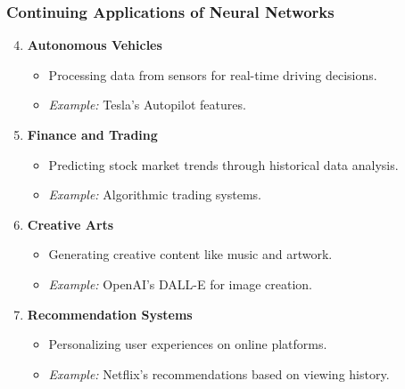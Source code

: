\documentclass[aspectratio=169]{beamer}
\begin{document}
\begin{frame}[fragile]
    \frametitle{Continuing Applications of Neural Networks}

    \begin{enumerate}
        \setcounter{enumi}{3} %
        \item \textbf{Autonomous Vehicles}
        \begin{itemize}
            \item Processing data from sensors for real-time driving decisions.
            \item \textit{Example:} Tesla's Autopilot features.
        \end{itemize}

        \item \textbf{Finance and Trading}
        \begin{itemize}
            \item Predicting stock market trends through historical data analysis.
            \item \textit{Example:} Algorithmic trading systems.
        \end{itemize}

        \item \textbf{Creative Arts}
        \begin{itemize}
            \item Generating creative content like music and artwork.
            \item \textit{Example:} OpenAI's DALL-E for image creation.
        \end{itemize}

        \item \textbf{Recommendation Systems}
        \begin{itemize}
            \item Personalizing user experiences on online platforms.
            \item \textit{Example:} Netflix's recommendations based on viewing history.
        \end{itemize}
    \end{enumerate}
\end{frame}
\end{document}
